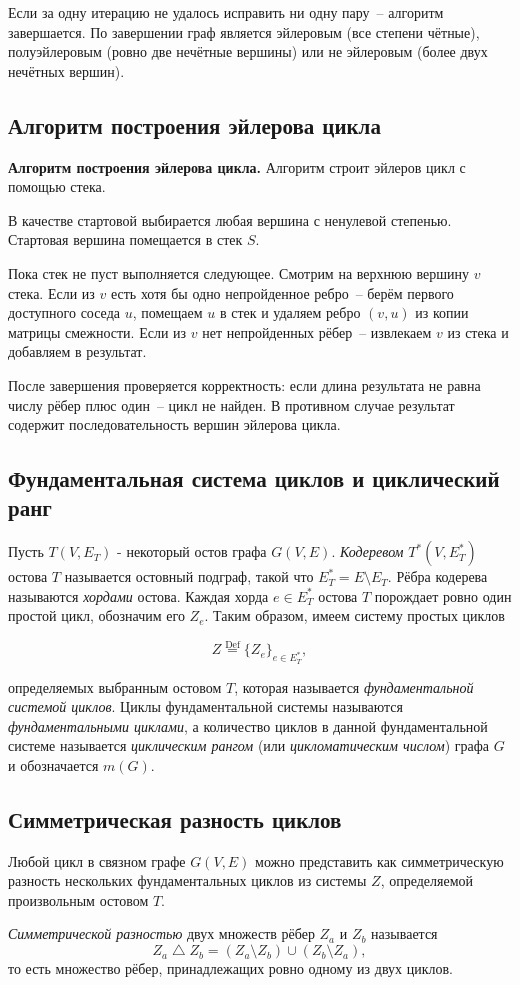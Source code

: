 Если за одну итерацию не удалось исправить ни одну пару~--
алгоритм завершается. По завершении граф является эйлеровым
(все степени чётные), полуэйлеровым (ровно две нечётные вершины)
или не эйлеровым (более двух нечётных вершин).

\subsection{Алгоритм построения эйлерова цикла}

\textbf{Алгоритм построения эйлерова цикла.}
Алгоритм строит эйлеров цикл с помощью стека.

В качестве стартовой выбирается любая вершина с ненулевой степенью.
Стартовая вершина помещается в стек $S$.

Пока стек не пуст выполняется следующее.
Смотрим на верхнюю вершину $v$ стека.
Если из $v$ есть хотя бы одно непройденное ребро~--
берём первого доступного соседа $u$, помещаем $u$ в стек
и удаляем ребро $(v, u)$ из копии матрицы смежности.
Если из $v$ нет непройденных рёбер~--
извлекаем $v$ из стека и добавляем в результат.

После завершения проверяется корректность: если длина результата
не равна числу рёбер плюс один~-- цикл не найден.
В противном случае результат содержит последовательность вершин
эйлерова цикла.

\subsection{Фундаментальная система циклов и циклический ранг}

Пусть $T(V, E_T)$ - некоторый остов графа $G(V, E)$.  
\textit{Кодеревом} $T^*(V, E_T^*)$ остова $T$ называется остовный подграф, такой что $E_T^* = E \setminus E_T$. Рёбра кодерева называются \textit{хордами} остова. Каждая хорда $e \in E_T^*$ остова $T$ порождает ровно один простой цикл, обозначим его $Z_e$.  
Таким образом, имеем систему простых циклов



\[
Z \stackrel{\text{Def}}{=} \{ Z_e \}_{e \in E_T^*},
\]



определяемых выбранным остовом $T$, которая называется \textit{фундаментальной системой циклов}.  
Циклы фундаментальной системы называются \textit{фундаментальными циклами}, а количество циклов в данной фундаментальной системе называется \textit{циклическим рангом} (или \textit{цикломатическим числом}) графа $G$ и обозначается $m(G)$.


\subsection{Симметрическая разность циклов}

Любой цикл в связном графе $G(V, E)$ можно представить как симметрическую разность нескольких фундаментальных циклов из системы $Z$, определяемой произвольным остовом $T$.

\textit{Симметрической разностью} двух множеств рёбер $Z_a$ и $Z_b$ называется
\[
    Z_a \mathbin{\triangle} Z_b
    = (Z_a \setminus Z_b) \cup  (Z_b \setminus Z_a),
\]
то есть множество рёбер, принадлежащих ровно одному из двух циклов.